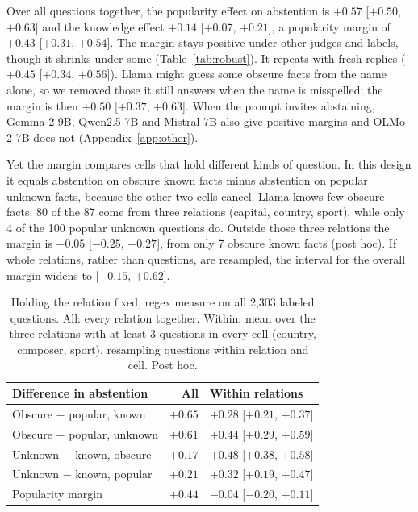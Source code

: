 \documentclass[letterpaper]{article} %
\begin{document}
Over all questions together, the popularity effect on abstention is $+0.57$ [$+0.50$, $+0.63$] and the knowledge effect $+0.14$ [$+0.07$, $+0.21$], a popularity margin of $+0.43$ [$+0.31$, $+0.54$]. The margin stays positive under other judges and labels, though it shrinks under some (Table~\ref{tab:robust}). It repeats with fresh replies ($+0.45$ [$+0.34$, $+0.56$]). Llama might guess some obscure facts from the name alone, so we removed those it still answers when the name is misspelled; the margin is then $+0.50$ [$+0.37$, $+0.63$]. When the prompt invites abstaining, Gemma-2-9B, Qwen2.5-7B and Mistral-7B also give positive margins and OLMo-2-7B does not (Appendix~\ref{app:other}).

Yet the margin compares cells that hold different kinds of question. In this design it equals abstention on obscure known facts minus abstention on popular unknown facts, because the other two cells cancel. Llama knows few obscure facts: 80 of the 87 come from three relations (capital, country, sport), while only 4 of the 100 popular unknown questions do. Outside those three relations the margin is $-0.05$ [$-0.25$, $+0.27$], from only 7 obscure known facts (post hoc). If whole relations, rather than questions, are resampled, the interval for the overall margin widens to [$-0.15$, $+0.62$].

\begin{table}[t]
\centering
\small
\setlength{\tabcolsep}{1.2mm}
\begin{tabular}{@{}lrl@{}}
\toprule
Difference in abstention & All & Within relations \\
\midrule
Obscure $-$ popular, known & $+0.65$ & $+0.28$ [$+0.21$, $+0.37$] \\
Obscure $-$ popular, unknown & $+0.61$ & $+0.44$ [$+0.29$, $+0.59$] \\
Unknown $-$ known, obscure & $+0.17$ & $+0.48$ [$+0.38$, $+0.58$] \\
Unknown $-$ known, popular & $+0.21$ & $+0.32$ [$+0.19$, $+0.47$] \\
\midrule
Popularity margin & $+0.44$ & $-0.04$ [$-0.20$, $+0.11$] \\
\bottomrule
\end{tabular}
\caption{Holding the relation fixed, regex measure on all 2,303 labeled questions. All: every relation together. Within: mean over the three relations with at least 3 questions in every cell (country, composer, sport), resampling questions within relation and cell. Post hoc.}
\label{tab:within}
\end{table}
\end{document}
